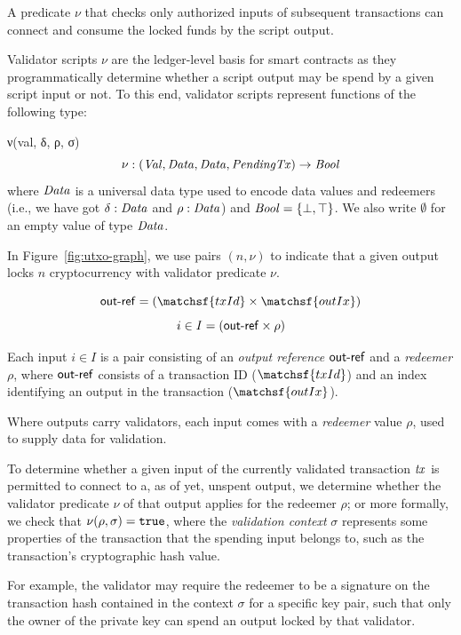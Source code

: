 \begin{definition}
A predicate $\nu$ that checks only authorized inputs of subsequent transactions can
connect and consume the locked funds by the script output.

Validator scripts $\nu$ are the ledger-level basis for smart
contracts as they programmatically determine whether a script output
may be spend by a given script input or not. To this end, validator
scripts represent functions of the following type:

ν(val, δ, ρ, σ)
\[
  \nu : (\mathit{Val}, \mathit{Data}, \mathit{Data}, \mathit{PendingTx})
  \to\mathit{Bool}
\]
where $\mathit{Data}$ is a universal data type used to encode data
values and redeemers (i.e., we have got \(\delta : \mathit{Data}\) and
\(\rho : \mathit{Data}\)) and $\mathit{Bool} = \{\bot, \top\}$. We also
write $\emptyset$ for an empty value of type $\mathit{Data}$.  

In Figure~\ref{fig:utxo-graph}, we use pairs \((n, \nu)\) to indicate that a given output locks $n$ cryptocurrency with validator predicate $\nu$.
\end{definition}

\begin{definition}[Inputs]
$$\txOutRef = (\matchsf{txId} \times \matchsf{outIx})$$
$$i \in I = (\mathsf{out\textsf{-}{}ref} \times \rho)$$

Each input \(i\in I\) is a pair consisting of an \emph{output reference} $\mathsf{out\textsf{-}{}ref}$ and a \emph{redeemer} $\rho$, where $\mathsf{out\textsf{-}{}ref}$ consists of a transaction ID ($\matchsf{txId}$) and an index identifying an output in the transaction ($\matchsf{outIx}$).
\end{definition}

\begin{definition}[Redeemer]
Where outputs carry validators, each input comes with a \emph{redeemer} value $\rho$, used to supply data for validation. 

To determine whether a given input of the currently validated transaction $\mathit{tx}$ is permitted to connect to a, as of yet, unspent output, we determine whether the validator predicate $\nu$ of that output applies for the redeemer $\rho$; or more formally, we check that \(\nu(\rho, \sigma) = \mathtt{true}\), where the \emph{validation context} $\sigma$ represents some properties of the transaction that the spending input belongs to, such as the transaction's cryptographic hash value. 

For example, the validator may require the redeemer to be a signature on the transaction hash contained in the context $\sigma$ for a specific key pair, such that only the owner of the private key can spend an output locked by that validator.
\end{definition}

